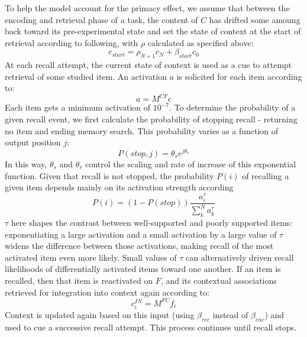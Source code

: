 {}To help the model account for the primacy effect, we assume that between the encoding and retrieval phase of a task, the content of $C$ has drifted some amoung back toward its pre-experimental state and set the state of context at the start of retrieval according to following, with $\rho$ calculated as specified above:\markdownRendererInterblockSeparator
{}\begin{equation} \label{eq:9} c_{start} = \rho_{N+1}c_N + \beta_{start}c_0 \end{equation}\markdownRendererInterblockSeparator
{}At each recall attempt, the current state of context is used as a cue to attempt retrieval of some studied item. An activation $a$ is solicited for each item according to:\markdownRendererInterblockSeparator
{}\begin{equation} \label{eq:10} a = M^{CF}c \end{equation}\markdownRendererInterblockSeparator
{}Each item gets a minimum activation of $10^{-7}$. To determine the probability of a given recall event, we first calculate the probability of stopping recall - returning no item and ending memory search. This probability varies as a function of output position $j$:\markdownRendererInterblockSeparator
{}\begin{equation} \label{eq:11} P(stop, j) = \theta_se^{j\theta_r} \end{equation}\markdownRendererInterblockSeparator
{}In this way, $\theta_s$ and $\theta_r$ control the scaling and rate of increase of this exponential function. Given that recall is not stopped, the probability $P(i)$ of recalling a given item depends mainly on its activation strength according\markdownRendererInterblockSeparator
{}\begin{equation} \label{eq:12} P(i) = (1-P(stop))\frac{a^{\tau}_i}{\sum_{k}^{N}a^{\tau}_k} \end{equation}\markdownRendererInterblockSeparator
{}$\tau$ here shapes the contrast between well-supported and poorly supported items: exponentiating a large activation and a small activation by a large value of $\tau$ widens the difference between those activations, making recall of the most activated item even more likely. Small values of $\tau$ can alternatively driven recall likelihoods of differentially activated items toward one another.\markdownRendererInterblockSeparator
{}If an item is recalled, then that item is reactivated on $F$, and its contextual associations retrieved for integration into context again according to:\markdownRendererInterblockSeparator
{}\begin{equation} \label{eq:13} c^{IN}_{i} = M^{FC}f_{i} \end{equation}\markdownRendererInterblockSeparator
{}Context is updated again based on this input (using $\beta_{rec}$ instead of $\beta_{enc}$) and used to cue a successive recall attempt. This process continues until recall stops.\relax